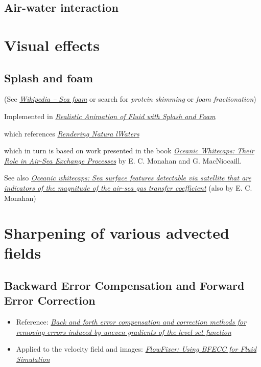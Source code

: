 \subsection{Air-water interaction}

\section{Visual effects}

\subsection{Splash and foam}

(See \textit{\href{http://en.wikipedia.org/wiki/Sea_foam}{Wikipedia -- Sea foam}} or search for \textit{protein skimming} or \textit{foam fractionation})

Implemented in \textit{\href{http://nguyendangbinh.org/Proceedings/Eurographics/2003/cgf/volume22/issue3/paper127/paper127.pdf}{Realistic Animation of Fluid with Splash and Foam}}

which references \textit{\href{http://citeseerx.ist.psu.edu/viewdoc/download?doi=10.1.1.4.6262&rep=rep1&type=pdf}{Rendering Natura lWaters}}

which in turn is based on work presented in the book \textit{\href{http://books.google.se/books?id=xuwFz1bPTHgC}{Oceanic Whitecaps: Their Role in Air-Sea Exchange Processes}} by E. C. Monahan and G. MacNiocaill.

See also \textit{\href{http://www.ias.ac.in/jess/sep2002/Ps18.pdf}{Oceanic whitecaps: Sea surface features detectable via satellite that are indicators of the magnitude of the air-sea gas transfer coefficient}} (also by  E. C. Monahan)

\section{Sharpening of various advected fields}

\subsection{Backward Error Compensation and Forward Error Correction}

\begin{itemize}
    \item Reference: \textit{\href{http://smartech.gatech.edu/xmlui/bitstream/handle/1853/29473/2002-389.pdf}{Back and forth error compensation and correction methods for removing errors induced by uneven gradients of the level set function}}
    \item Applied to the velocity field and images: \textit{\href{http://www.gvu.gatech.edu/~jarek/papers/FlowFixer.pdf}{FlowFixer: Using BFECC for Fluid Simulation}}
\end{itemize}

